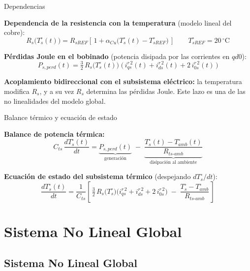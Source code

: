 \documentclass[aspectratio=169,t]{beamer}
\newcommand{\SecPresentacion}{Presentación del problema}
\newcommand{\SecMecanico}{Subsistema mecánico equivalente}
\newcommand{\SecElectromagnetico}{Subsistema electromagnético en coordenadas qd0}
\newcommand{\SecTermico}{Subsistema térmico}
\newcommand{\SecNLGlobal}{Sistema No Lineal Global}
\newcommand{\SecLPV}{Linealización Jacobiana (LPV)}
\newcommand{\SecLTI}{Obtención del modelo LTI equivalente}
\newcommand{\SecAnalisisLTI}{Análisis del modelo LTI aumentado}
\newcommand{\SecDinamica}{Respuesta dinámica en dominio del tiempo}
\newcommand{\SecControlador}{Diseño y análisis del controlador en cascada}
\newcommand{\SecVerifSpecs}{Verificación de desempeño: Especificaciones de operación}
\newcommand{\SecVerifOffset}{Verificación de desempeño: Offset de estado estacionario}
\newcommand{\SecVerifNoIdealidades}{Verificación de desempeño: No idealidades y comportamiento térmico}
\newcommand{\SecDiscretizacion}{Discretización del controlador}
\newcommand{\SecSoftware}{Codificación del software de control}
\newcommand{\AgendaItem}[3]{%
  \ifnum#1=#2
    {\scriptsize\bfseries\color{uncBlue}%
      \hyperlink{sec:#1}{\makebox[2.2em][r]{#1.}\hspace{0.7em}%
      \parbox[t]{0.86\textwidth}{#3}}\par}%
  \else
    {\scriptsize\color{black!26}%
      \hyperlink{sec:#1}{\makebox[2.2em][r]{#1.}\hspace{0.7em}%
      \parbox[t]{0.86\textwidth}{#3}}\par}%
  \fi
  \vspace{0.35mm}%
}
\newcommand{\AgendaBody}[1]{%
    \vspace{3mm}
    {\Large\bfseries\color{uncBlue}Tabla de contenidos\par}
    \vspace{2mm}
    \begin{minipage}{0.94\textwidth}
      \AgendaItem{1}{#1}{\SecPresentacion}
      \AgendaItem{2}{#1}{\SecMecanico}
      \AgendaItem{3}{#1}{\SecElectromagnetico}
      \AgendaItem{4}{#1}{\SecTermico}
      \AgendaItem{5}{#1}\SecNLGlobal
      \AgendaItem{6}{#1}{\SecLPV}
      \AgendaItem{7}{#1}{\SecLTI}
      \AgendaItem{8}{#1}{\SecAnalisisLTI}
      \AgendaItem{9}{#1}{\SecDinamica}
      \AgendaItem{10}{#1}{\SecControlador}
      \AgendaItem{11}{#1}{\SecVerifSpecs}
      \AgendaItem{12}{#1}{\SecVerifOffset}
      \AgendaItem{13}{#1}{\SecVerifNoIdealidades}
      \AgendaItem{14}{#1}{\SecDiscretizacion}
      \AgendaItem{15}{#1}{\SecSoftware}
    \end{minipage}
    \vfill
}
\newcommand{\AgendaSlideTarget}[2]{%
  \begin{frame}[plain]
    \hypertarget{#2}{}%
    \AgendaBody{#1}
  \end{frame}
}
\newcommand{\StartProjectSection}[2]{%
  \section{#2}%
  \subsection{#2}%
  \AgendaSlideTarget{#1}{sec:#1}%
}
\begin{document}
\begin{frame}{Dependencias}
\vspace{4mm}

\textbf{Dependencia de la resistencia con la temperatura} (modelo lineal del cobre):
\begin{equation*}
R_s\!\big(T_s^\circ(t)\big) = R_{sREF}\!\left[\,1 + \alpha_{Cu}\!\big(T_s^\circ(t) - T_{sREF}^\circ\big)\,\right]
\qquad T_{sREF}^\circ = 20\,^\circ\text{C}
\end{equation*}

\textbf{Pérdidas Joule en el bobinado} (potencia disipada por las corrientes en $qd0$):
\begin{equation*}
P_{s,perd}(t) = \tfrac{3}{2}\,R_s\!\big(T_s^\circ(t)\big)\;\big(\,i_{qs}^{r\,2}(t) + i_{ds}^{r\,2}(t) + 2\,i_{0s}^{r\,2}(t)\,\big)
\end{equation*}

\vspace{2mm}
{\small \textbf{Acoplamiento bidireccional con el subsistema eléctrico:} la temperatura modifica $R_s$, y a su vez $R_s$ determina las pérdidas Joule. Este lazo es una de las no linealidades del modelo global.}
\end{frame}

\begin{frame}{Balance térmico y ecuación de estado}
\vspace{3mm}

\textbf{Balance de potencia térmica:}
\begin{equation*}
C_{ts}\,\frac{dT_s^\circ(t)}{dt} = \underbrace{P_{s,perd}(t)}_{\text{generación}} \;-\; \underbrace{\frac{T_s^\circ(t) - T_{amb}^\circ(t)}{R_{ts\text{-}amb}}}_{\text{disipación al ambiente}}
\end{equation*}

\textbf{Ecuación de estado del subsistema térmico} (despejando $dT_s^\circ/dt$):
\begin{equation*}
\frac{dT_s^\circ(t)}{dt} = \frac{1}{C_{ts}}\!\left[\,\tfrac{3}{2}\,R_s\!\big(T_s^\circ\big)\big(i_{qs}^{r\,2}+i_{ds}^{r\,2}+2\,i_{0s}^{r\,2}\big) \;-\; \frac{T_s^\circ - T_{amb}^\circ}{R_{ts\text{-}amb}}\,\right]
\end{equation*}

\end{frame}
\StartProjectSection{5}{\SecNLGlobal}
\end{document}
